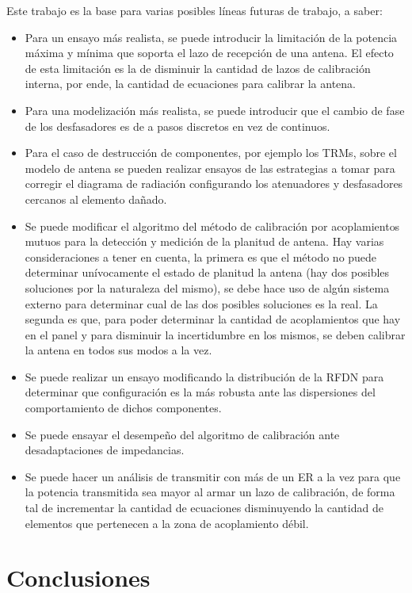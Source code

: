 Este trabajo es la base para varias posibles líneas futuras de trabajo, a saber:
\begin{itemize}
	\item Para un ensayo más realista, se puede introducir la limitación de la potencia máxima y mínima que soporta el lazo 
		de recepción de una antena. El efecto de esta limitación es la de disminuir la cantidad de lazos de calibración interna, 
		por ende, la cantidad de ecuaciones para calibrar la antena.
	\item Para una modelización más realista, se puede introducir que el cambio de fase de los desfasadores es de a pasos discretos
		en vez de continuos.
	\item Para el caso de destrucción de componentes, por ejemplo los TRMs, sobre el modelo de antena se pueden realizar ensayos 
		de las estrategias a tomar para corregir el diagrama de radiación configurando los atenuadores y desfasadores cercanos al 
		elemento dañado.
	\item Se puede modificar el algoritmo del método de calibración por acoplamientos mutuos para la detección y medición de 
		la planitud de antena. Hay varias consideraciones a tener en cuenta, la primera es que el método no puede determinar 
		unívocamente el estado de planitud la antena (hay dos posibles soluciones por la naturaleza del mismo), se debe hace uso de 
		algún sistema externo para determinar cual de las dos posibles soluciones es la real. La segunda es que, para poder determinar
		la cantidad de acoplamientos que hay en el panel y para disminuir la incertidumbre en los mismos, se deben calibrar la antena 
		en todos sus modos a la vez.
	\item Se puede realizar un ensayo modificando la distribución de la RFDN para determinar que configuración es la más robusta ante 
		las dispersiones del comportamiento de dichos componentes.
	\item Se puede ensayar el desempeño del algoritmo de calibración ante desadaptaciones de impedancias. 
	\item Se puede hacer un análisis de transmitir con más de un ER a la vez para que la potencia transmitida sea mayor al armar
		un lazo de calibración, de forma tal de incrementar la cantidad de ecuaciones disminuyendo la cantidad de elementos que
		pertenecen a la zona de acoplamiento débil. 
\end{itemize}

\section{Conclusiones}

